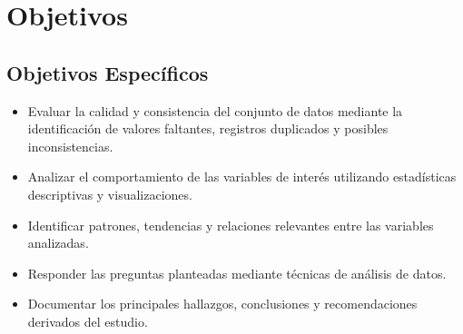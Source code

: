 \chapter{Objetivos}



\section*{Objetivos Específicos}

\begin{itemize}

\item Evaluar la calidad y consistencia del conjunto de datos mediante la identificación de valores faltantes, registros duplicados y posibles inconsistencias.

\item Analizar el comportamiento de las variables de interés utilizando estadísticas descriptivas y visualizaciones.

\item Identificar patrones, tendencias y relaciones relevantes entre las variables analizadas.

\item Responder las preguntas planteadas mediante técnicas de análisis de datos.

\item Documentar los principales hallazgos, conclusiones y recomendaciones derivados del estudio.

\end{itemize}